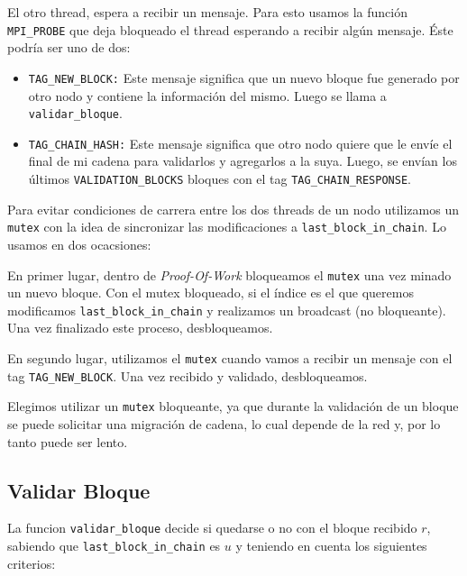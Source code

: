 El otro thread, espera a recibir un mensaje. Para esto usamos la funci\'on \texttt{MPI\_PROBE} que deja bloqueado el thread esperando a recibir alg\'un mensaje. \'Este podr\'ia ser uno de dos: 
\begin{itemize}
	\item \texttt{TAG\_NEW\_BLOCK:} Este mensaje significa que un nuevo bloque fue generado por otro nodo y contiene la informaci\'on del mismo. Luego se llama a \texttt{validar\_bloque}.
	\item \texttt{TAG\_CHAIN\_HASH:} Este mensaje significa que otro nodo quiere que le env\'ie el final de mi cadena para validarlos y agregarlos a la suya. Luego, se env\'ian los \'ultimos \texttt{VALIDATION\_BLOCKS} bloques con el tag \texttt{TAG\_CHAIN\_RESPONSE}.
\end{itemize}

Para evitar condiciones de carrera entre los dos threads de un nodo utilizamos un \texttt{mutex} con la idea de sincronizar las modificaciones a \texttt{last\_block\_in\_chain}. Lo usamos en dos ocacsiones:

En primer lugar, dentro de \textit{Proof-Of-Work} bloqueamos el \texttt{mutex} una vez minado un nuevo bloque. Con el mutex bloqueado, si el \'indice es el que queremos modificamos \texttt{last\_block\_in\_chain} y realizamos un broadcast (no bloqueante). Una vez finalizado este proceso, desbloqueamos.

En segundo lugar, utilizamos el \texttt{mutex} cuando  vamos a recibir un mensaje con el tag \texttt{TAG\_NEW\_BLOCK}. Una vez recibido y validado, desbloqueamos.

Elegimos utilizar un \texttt{mutex} bloqueante, ya que durante la validaci\'on de un bloque se puede solicitar una migración de cadena, lo cual depende de la red y, por lo tanto puede ser lento. 

\subsection{Validar Bloque}

La funcion \texttt{validar\_bloque} decide si quedarse o no con el bloque recibido $r$, sabiendo que \texttt{last\_block\_in\_chain} es $u$ y teniendo en cuenta los siguientes criterios:

